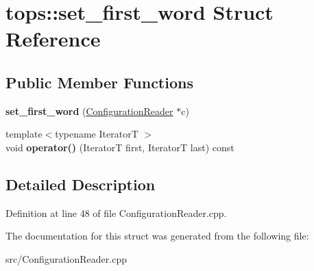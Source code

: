 \hypertarget{structtops_1_1set__first__word}{}\section{tops\+:\+:set\+\_\+first\+\_\+word Struct Reference}
\label{structtops_1_1set__first__word}
\subsection*{Public Member Functions}
\begin{DoxyCompactItemize}
\item 
\mbox{\label{structtops_1_1set__first__word_a56d3dcf07ec354e2b58e6de939b55177}} 
{\bfseries set\+\_\+first\+\_\+word} (\hyperlink{classtops_1_1ConfigurationReader}{Configuration\+Reader} $\ast$c)
\item 
\mbox{\label{structtops_1_1set__first__word_a547e463d9d77e889a5bdae8bba5847ba}} 
{\footnotesize template$<$typename IteratorT $>$ }\\void {\bfseries operator()} (IteratorT first, IteratorT last) const
\end{DoxyCompactItemize}


\subsection{Detailed Description}


Definition at line 48 of file Configuration\+Reader.\+cpp.



The documentation for this struct was generated from the following file\+:\begin{DoxyCompactItemize}
\item 
src/Configuration\+Reader.\+cpp\end{DoxyCompactItemize}
